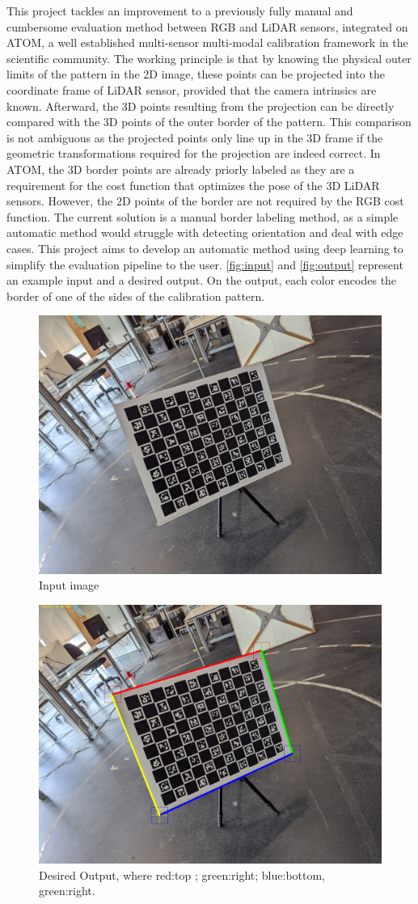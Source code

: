 This project tackles an improvement to a previously fully manual and cumbersome evaluation method between RGB and LiDAR sensors,
integrated on ATOM, a well established multi-sensor multi-modal calibration framework in the
scientific community. The working principle is that by knowing the
physical outer limits of the pattern in the 2D image, these points can be projected into the coordinate frame of LiDAR sensor, provided
that the camera intrinsics are known. Afterward, the 3D points resulting from the projection can be directly compared with the 3D
points of the outer border of the pattern. This comparison is not ambiguous as the projected points only line up in the 3D frame if the
geometric transformations required for the projection are indeed correct. In ATOM, the 3D border points are already priorly labeled as
they are a requirement for the cost function that optimizes the pose of the 3D LiDAR sensors. However, the 2D points of the border are not
required by the RGB cost function. The current solution is a manual border labeling method, as a
simple automatic method would struggle with detecting orientation and deal with edge cases. This
project aims to develop an automatic method using deep learning to simplify the evaluation pipeline to the user. \autoref{fig:input}
and \autoref{fig:output} represent an example input and a desired output. On the output, each color encodes the border of one of the
sides of the calibration pattern.

\begin{figure}[h]
    \centering
    \includegraphics[width=0.8\linewidth]{resources/images/pattern_28.jpg}
    \caption{Input image}
    \label{fig:input}
\end{figure}

\begin{figure}[h]
    \centering
    \includegraphics[width=0.8\linewidth]{resources/images/pattern_28_lines.png}
    \caption{Desired Output, where red:top ; green:right; blue:bottom, green:right.}
    \label{fig:output}
\end{figure}


